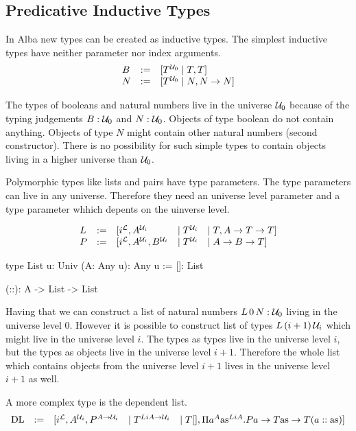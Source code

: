 \subsection{Predicative Inductive Types}

In Alba new types can be created as inductive types. The simplest inductive
types have neither parameter nor index arguments.
$$
\begin{array}{lll}
    B &:=& [T^{{\mathcal U}_0} \mid T, T]
    \\
    N &:=& [T^{{\mathcal U}_0} \mid N, N \to N]
\end{array}
$$

The types of booleans and natural numbers live in the universe ${\mathcal U}_0$ because
of the typing judgements $B: {\mathcal U}_0$ and $N: {\mathcal U}_0$. Objects of type boolean do
not contain anything. Objects of type $N$ might contain other natural numbers
(second constructor). There is no possibility for such simple types to contain
objects living in a higher universe than ${\mathcal U}_0$.

Polymorphic types like lists and pairs have type parameters. The type parameters
can live in any universe. Therefore they need an universe level parameter and a
type parameter whhich depents on the uinverse level.

$$
\begin{array}{lllll}
    L &:=& [i^{\mathcal L}, A^{{\mathcal U}_i} &\mid T^{{\mathcal U}_i} &\mid T, A \to T \to T]
    \\
    P &:=& [i^{\mathcal L}, A^{{\mathcal U}_i}, B^{{\mathcal U}_i} &\mid T^{{\mathcal U}_i} &\mid A \to B \to T]
\end{array}
$$

\begin{alba}
    type List {u: Univ} (A: Any u): Any u :=
        []: List

        (::): A -> List -> List
\end{alba}



Having that we can construct a list of natural numbers $L\,0\,N: {\mathcal U}_0$ living
in the universe level $0$. However it is possible to construct list of types
$L\,(i+1)\,{\mathcal U}_i$ which might live in the universe level $i$. The types as
types live in the universe level $i$, but the types as objects live in the
universe level $i+1$. Therefore the whole list which contains objects from the
universe level $i + 1$ lives in the universe level $i+1$ as well.


A more complex type is the dependent list.
$$
\begin{array}{lllll}
    \text{DL} &:=&
    [
        i^{\mathcal L}, A^{{\mathcal U}_i}, P^{A \to {\mathcal U}_i}
        &\mid
        T^{LiA \to {\mathcal U}_i}
        &\mid
        T[],
        \Pi a^A \text{as}^{LiA}.
            Pa \to T\text{as} \to T(a :: \text{as})
    ]
\end{array}
$$

